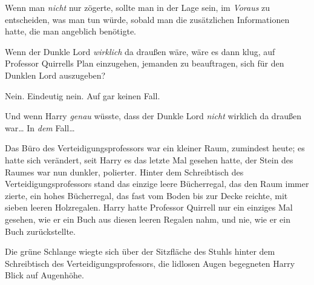 Wenn man \emph{nicht} nur zögerte, sollte man in der Lage sein, im \emph{Voraus} zu entscheiden, was man tun würde, sobald man die zusätzlichen Informationen hatte, die man angeblich benötigte.

Wenn der Dunkle Lord \emph{wirklich} da draußen wäre, wäre es dann klug, auf Professor Quirrells Plan einzugehen, jemanden zu beauftragen, sich für den Dunklen Lord auszugeben?

Nein. Eindeutig nein. Auf gar keinen Fall.

Und wenn Harry \emph{genau} wüsste, dass der Dunkle Lord \emph{nicht} wirklich da draußen war… In \emph{dem} Fall…

Das Büro des Verteidigungsprofessors war ein kleiner Raum, zumindest heute; es hatte sich verändert, seit Harry es das letzte Mal gesehen hatte, der Stein des Raumes war nun dunkler, polierter. Hinter dem Schreibtisch des Verteidigungsprofessors stand das einzige leere Bücherregal, das den Raum immer zierte, ein hohes Bücherregal, das fast vom Boden bis zur Decke reichte, mit sieben leeren Holzregalen. Harry hatte Professor Quirrell nur ein einziges Mal gesehen, wie er ein Buch aus diesen leeren Regalen nahm, und nie, wie er ein Buch zurückstellte.

Die grüne Schlange wiegte sich über der Sitzfläche des Stuhls hinter dem Schreibtisch des Verteidigungsprofessors, die lidlosen Augen begegneten Harry Blick auf Augenhöhe.

